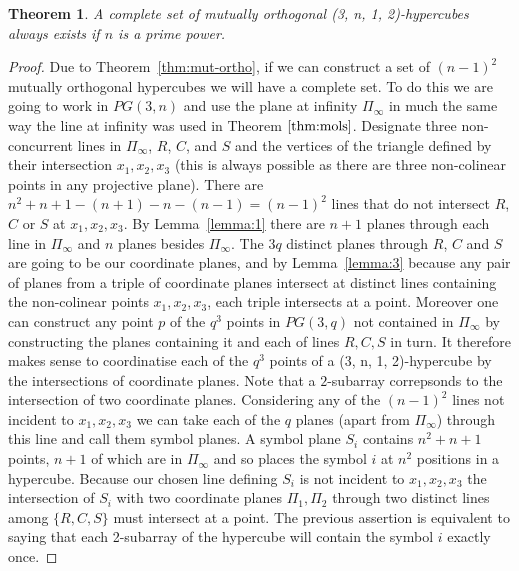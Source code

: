 \documentclass{article}
\newtheorem{theorem}{Theorem}
\begin{document}
    \begin{theorem}
        A complete set of mutually orthogonal (3, n, 1, 2)-hypercubes always exists if \(n\) is a prime power.
    \end{theorem}
    \begin{proof}
        Due to Theorem~\ref{thm:mut-ortho}, if we can construct a set of \({(n - 1)}^2\) mutually orthogonal hypercubes we will have a complete set. To do this we are going to work in \(PG(3,n)\) and use the plane at infinity \(\Pi_{\infty}\) in much the same way the line at infinity was used in Theorem \(\ref{thm:mols}\).
        Designate three non-concurrent lines in \(\Pi_{\infty}\), \(R\), \(C\), and \(S\) and the vertices of the triangle defined by their intersection \(x_1, x_2, x_3\) (this is always possible as there are three non-colinear points in any projective plane). 
        There are \(n^2 + n + 1 - (n + 1) - n - (n - 1) = {(n - 1)}^2\) lines that do not intersect \(R\), \(C\) or \(S\) at \(x_1, x_2, x_3\). By Lemma~\ref{lemma:1} there are \(n + 1\) planes through each line in \(\Pi_{\infty}\) and \(n\) planes besides \(\Pi_{\infty}\).
        The \(3q\) distinct planes through \(R\), \(C\) and \(S\) are going to be our coordinate planes, and by Lemma~\ref{lemma:3} because any pair of planes from a triple of coordinate planes intersect at distinct lines containing the non-colinear points \(x_1, x_2, x_3\), each triple intersects at a point.
        Moreover one can construct any point \(p\) of the \(q^3\) points in \(PG(3, q)\) not contained in \(\Pi_{\infty}\) by constructing the planes containing it and each of lines \(R, C, S\) in turn. It therefore makes sense to coordinatise each of the \(q^3\) points of a (3, n, 1, 2)-hypercube by the intersections of coordinate planes.
        Note that a \(2\)-subarray correpsonds to the intersection of two coordinate planes.
        Considering any of the \({(n - 1)}^2\) lines not incident to \(x_1, x_2, x_3\) we can take each of the \(q\) planes (apart from \(\Pi_{\infty}\)) through this line and call them symbol planes. A symbol plane \(S_i\) contains \(n^2 + n + 1\) points, \(n + 1\) of which are in \(\Pi_{\infty}\) and so places the symbol \(i\) at \(n^2\) positions in a hypercube.
        Because our chosen line defining \(S_i\) is not incident to \(x_1, x_2, x_3\) the intersection of \(S_i\) with two coordinate planes \(\Pi_1, \Pi_2\) through two distinct lines among \(\{R, C, S\}\) must intersect at a point. The previous assertion is equivalent to saying that each 2-subarray of the hypercube will contain the symbol \(i\) exactly once.

\end{proof}
\end{document}
